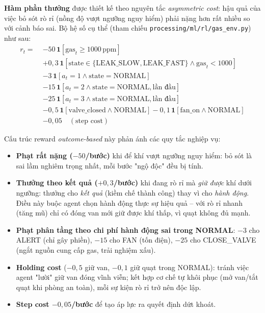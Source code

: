\textbf{Hàm phần thưởng} được thiết kế theo nguyên tắc \textit{asymmetric cost}: hậu quả của việc bỏ sót rò rỉ (nồng độ vượt ngưỡng nguy hiểm) phải nặng hơn rất nhiều so với cảnh báo sai. Bộ hệ số cụ thể (tham chiếu \texttt{processing/ml/rl/gas\_env.py}) như sau:
\begin{equation}
\begin{aligned}
  r_t = \; & -50\,\mathbf{1}[\text{gas}_t \geq 1000\,\text{ppm}] \\
          & + 0{,}3\,\mathbf{1}[\text{state} \in \{\text{LEAK\_SLOW}, \text{LEAK\_FAST}\} \land \text{gas}_t < 1000] \\
          & - 3\,\mathbf{1}[a_t = 1 \land \text{state} = \text{NORMAL}] \\
          & - 15\,\mathbf{1}[a_t = 2 \land \text{state} = \text{NORMAL}, \text{lần đầu}] \\
          & - 25\,\mathbf{1}[a_t = 3 \land \text{state} = \text{NORMAL}, \text{lần đầu}] \\
          & - 0{,}5\,\mathbf{1}[\text{valve\_closed} \land \text{NORMAL}] - 0{,}1\,\mathbf{1}[\text{fan\_on} \land \text{NORMAL}] \\
          & - 0{,}05 \quad (\text{step cost})
\end{aligned}
\end{equation}

Cấu trúc reward \textit{outcome-based} này phản ánh các quy tắc nghiệp vụ:
\begin{itemize}
  \item \textbf{Phạt rất nặng ($-50$/bước)} khi để khí vượt ngưỡng nguy hiểm: bỏ sót là sai lầm nghiêm trọng nhất, mỗi bước "ngộ độc" đều bị tính.
  \item \textbf{Thưởng theo kết quả ($+0{,}3$/bước)} khi đang rò rỉ mà \emph{giữ được} khí dưới ngưỡng: thưởng cho \emph{kết quả} (kiềm chế thành công) thay vì cho \emph{hành động}. Điều này buộc agent chọn hành động thực sự hiệu quả -- với rò rỉ nhanh (tăng mũ) chỉ có đóng van mới giữ được khí thấp, vì quạt không đủ mạnh.
  \item \textbf{Phạt phân tầng theo chi phí hành động sai trong NORMAL}: $-3$ cho ALERT (chỉ gây phiền), $-15$ cho FAN (tốn điện), $-25$ cho CLOSE\_VALVE (ngắt nguồn cung cấp gas, trải nghiệm xấu).
  \item \textbf{Holding cost} ($-0{,}5$ giữ van, $-0{,}1$ giữ quạt trong NORMAL): tránh việc agent "lười" giữ van đóng vĩnh viễn; kết hợp cơ chế tự khôi phục (mở van/tắt quạt khi phòng an toàn), mỗi sự kiện rò rỉ trở nên độc lập.
  \item \textbf{Step cost $-0{,}05$/bước} để tạo áp lực ra quyết định dứt khoát.
\end{itemize}

